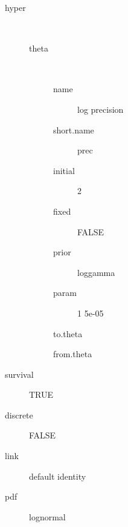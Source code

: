 \begin{description}
	\item[hyper]\ 
	 \begin{description}
	 	\item[theta]\ 
	 	 \begin{description}
	 	 	 \item[ name ] log precision 
	 	 	 \item[ short.name ] prec 
	 	 	 \item[ initial ] 2 
	 	 	 \item[ fixed ] FALSE 
	 	 	 \item[ prior ] loggamma 
	 	 	 \item[ param ] 1 5e-05 
	 	 	 \item[ to.theta ] \verb|| 
	 	 	 \item[ from.theta ] \verb|| 
	 	 \end{description}
	 \end{description}
	 \item[ survival ] TRUE 
	 \item[ discrete ] FALSE 
	 \item[ link ] default identity 
	 \item[ pdf ] lognormal 
\end{description}
